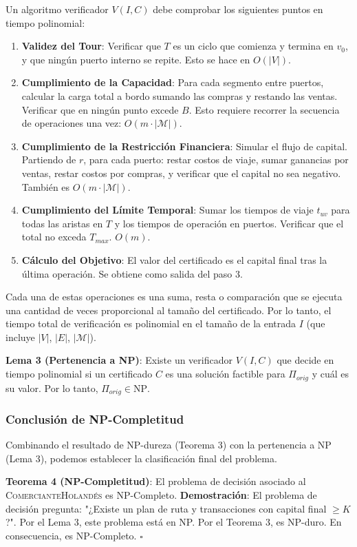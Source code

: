 \documentclass{article}
\begin{document}
Un algoritmo verificador $V(I, C)$ debe comprobar los siguientes puntos en
tiempo polinomial: \begin{enumerate} \item \textbf{Validez del Tour}: Verificar
que $T$ es un ciclo que comienza y termina en $v_0$, y que ningún puerto interno
se repite. Esto se hace en $O(|V|)$. \item \textbf{Cumplimiento de la Capacidad}:
Para cada segmento entre puertos, calcular la carga total a bordo sumando las
compras y restando las ventas. Verificar que en ningún punto excede $B$. Esto
requiere recorrer la secuencia de operaciones una vez: $O(m \cdot
|\mathcal{M}|)$. \item \textbf{Cumplimiento de la Restricción Financiera}:
Simular el flujo de capital. Partiendo de $r$, para cada puerto: restar costos
de viaje, sumar ganancias por ventas, restar costos por compras, y verificar que
el capital no sea negativo. También es $O(m \cdot |\mathcal{M}|)$. \item
\textbf{Cumplimiento del Límite Temporal}: Sumar los tiempos de viaje $t_{uv}$
para todas las aristas en $T$ y los tiempos de operación en puertos. Verificar
que el total no exceda $T_{max}$. $O(m)$. \item \textbf{Cálculo del Objetivo}:
El valor del certificado es el capital final tras la última operación. Se
obtiene como salida del paso 3. \end{enumerate}

Cada una de estas operaciones es una suma, resta o comparación que se ejecuta
una cantidad de veces proporcional al tamaño del certificado. Por lo tanto, el
tiempo total de verificación es polinomial en el tamaño de la entrada $I$ (que
incluye $|V|$, $|E|$, $|\mathcal{M}|$).

\textbf{Lema 3 (Pertenencia a NP)}: Existe un verificador $V(I, C)$ que decide
en tiempo polinomial si un certificado $C$ es una solución factible para
$\Pi_{orig}$ y cuál es su valor. Por lo tanto, $\Pi_{orig} \in \text{NP}$.

\subsubsection*{Conclusión de NP-Completitud} Combinando el resultado de
NP-dureza (Teorema 3) con la pertenencia a NP (Lema 3), podemos establecer la
clasificación final del problema.

\textbf{Teorema 4 (NP-Completitud)}: El problema de decisión asociado al
\textsc{ComercianteHolandés} es NP-Completo. \textbf{Demostración}: El problema
de decisión pregunta: "¿Existe un plan de ruta y transacciones con capital final
$\geq K$?". Por el Lema 3, este problema está en NP. Por el Teorema 3, es
NP-duro. En consecuencia, es NP-Completo. \hfill $\square$
\end{document}
